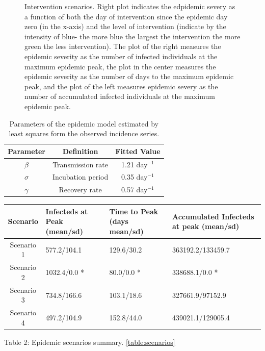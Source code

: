 \documentclass[11pt]{article}
\begin{document}
\begin{figure}[ht]
\caption{\small Intervention scenarios. Right plot indicates the edpidemic severy as a function of both the day of intervention since the epidemic day zero (in the x-axis) and the level of intervention (indicate by the intensity of blue- the more blue the largest the intervention the more green the less intervention). The plot of the right measures the epidemic severity as the number of infected individuals at the maximum epidemic peak, the plot in the center measures the epidemic severity as the number of days to the maximum epidemic peak, and the plot of the left measures epidemic severy as the number of accumulated infected individuals at the maximum epidemic peak.  
}
\label{fig:interventions-summary}
\end{figure}

%
\begin{table}[ht]
\centering
\begin{tabular}{|c|c|c|}
\hline
\textbf{Parameter} & \textbf{Definition} & \textbf{Fitted Value} \\
\hline
$\beta$ & Transmission rate & 1.21 day$^{-1}$ \\
\hline
$\sigma$ & Incubation period & 0.35 day$^{-1}$\\
\hline
$\gamma$ & Recovery rate & 0.57 day$^{-1}$\\
\hline
\end{tabular}
\caption{\label{tab:parameters} \small Parameters of the epidemic model estimated by least squares form the observed incidence series.}
\end{table}

\begin{center}
    \begin{tabular}{| c | p{3cm} | p{3cm}| p{3cm} |}
    \hline
    Scenario & Infecteds at Peak (mean/sd)& Time to Peak (days mean/sd) & Accumulated Infecteds at peak (mean/sd) \\ \hline
    Scenario 1 & 577.2/104.1  & 129.6/30.2 & 363192.2/133459.7 \\ \hline
    Scenario 2 & 1032.4/0.0 * & 80.0/0.0 *  & 338688.1/0.0 * \\ \hline
    Scenario 3 & 734.8/166.6 & 103.1/18.6 & 327661.9/97152.9 \\ \hline
    Scenario 4 & 497.2/104.9 & 152.8/44.0 & 439021.1/129005.4 \\
    \hline
    \end{tabular}
    {\small Table 2: Epidemic scenarios summary.}
    \ref{table:scenarios}
\end{center}
\end{document}

